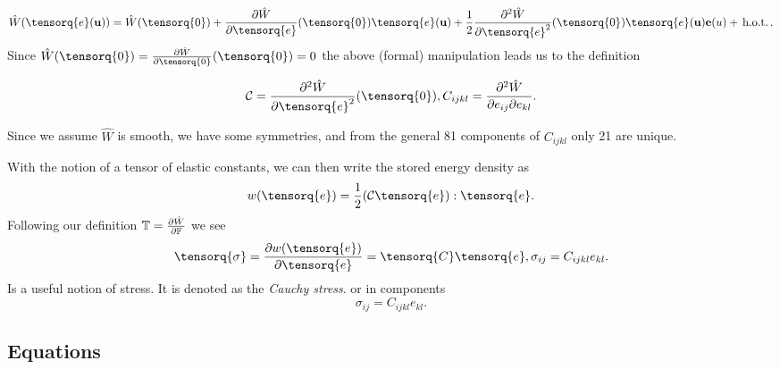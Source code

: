 \documentclass[11pt]{scrartcl} %
\begin{document}
\[
	\hat{W}\qty(\tensorq{e}\qty(\vb{u}))= \hat{W}\qty(\tensorq{0})+ \pdv{\hat{W}}{\tensorq{e}}\qty(\tensorq{0})\tensorq{e}\qty(\vb{u})+\frac{1}{2}\pdv[2]{\hat{W}}{\tensorq{e}}\qty(\tensorq{0})\tensorq{e}\qty(\vb{u}) \vb{e}\qty(u) + \, \text{h.o.t.} \,.
\]
Since $\hat{W}\qty(\tensorq{0}) = \pdv{\hat{W}}{\tensorq{0}}\qty(\tensorq{0}) = 0$ the above (formal) manipulation leads us to the definition
\begin{definition}
	\[
	\mathcal{C} = \pdv[2]{\hat{W}}{\tensorq{e}}\qty(\tensorq{0}), C_{ijkl} = \pdv[2]{\hat{W}}{e_{ij}}{e_{kl}}.
	\]
\end{definition}
\begin{remark}
    Since we assume $\hat{W}$ is smooth, we have some symmetries, and from the general 81 components of $C_{ijkl}$ only 21 are unique.
\end{remark}

With the notion of a tensor of elastic constants, we can then write the stored energy density as
\[
	w\qty(\tensorq{e}) = \frac{1}{2}(\mathcal{C}\tensorq{e}):\tensorq{e}.
\]
Following our definition $\mathbb{T} = \pdv{\hat{W}}{\ensuremath{\mathbb{F}}}$ we see
\[
	\tensorq{\sigma} = \pdv{w\qty(\tensorq{e})}{\tensorq{e}} = \tensorq{C}\tensorq{e}, \sigma_{ij} = C_{ijkl}e_{kl}.
\]
Is a useful notion of stress. It is denoted as the \textit{Cauchy stress}.
or in components
\[
	\sigma_{ij}=C_{ijkl}e_{kl}.
\]

\subsection{Equations}
\label{sec:linel_equations}
\end{document}
